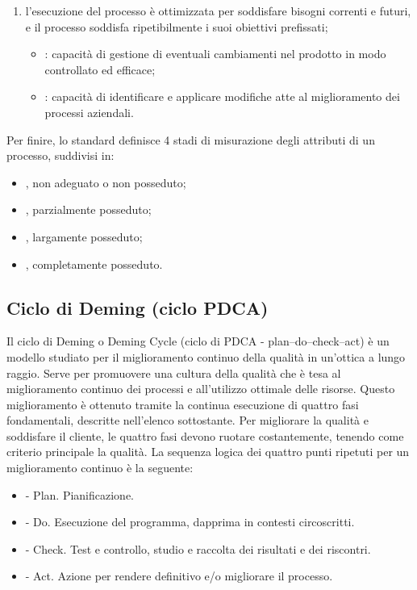 \begin{enumerate}
\begin{itemize}
\end{itemize}
\item  {} l'esecuzione del processo è ottimizzata per soddisfare bisogni correnti e futuri, e il processo soddisfa ripetibilmente i suoi obiettivi prefissati;
\begin{itemize}
\item {}: capacità di gestione di eventuali cambiamenti nel prodotto in modo controllato ed efficace;
\item {}: capacità di identificare e applicare modifiche atte al miglioramento dei processi aziendali.
\end{itemize}
\end{enumerate}
Per finire, lo standard definisce 4 stadi di misurazione degli attributi di un processo, suddivisi in:
\begin{itemize}
\item {}, non adeguato o non posseduto;
\item {}, parzialmente posseduto;
\item {}, largamente posseduto;
\item {}, completamente posseduto.
\end{itemize}

\subsection{Ciclo di Deming (ciclo PDCA)} %

Il ciclo di Deming o Deming Cycle (ciclo di PDCA - plan–do–check–act) è un modello studiato per il miglioramento continuo della qualità in un'ottica a lungo raggio. Serve per promuovere una cultura della qualità che è tesa al miglioramento continuo dei processi e all'utilizzo ottimale delle risorse. Questo miglioramento è ottenuto tramite la continua esecuzione di quattro fasi fondamentali, descritte nell'elenco sottostante. Per migliorare la qualità e soddisfare il cliente, le quattro fasi devono ruotare costantemente, tenendo come criterio principale la qualità.
La sequenza logica dei quattro punti ripetuti per un miglioramento continuo è la seguente:
\begin{itemize}
\item {} - Plan. Pianificazione.
\item {} - Do. Esecuzione del programma, dapprima in contesti circoscritti.
\item {} - Check. Test e controllo, studio e raccolta dei risultati e dei riscontri.
\item {} - Act. Azione per rendere definitivo e/o migliorare il processo.
\end{itemize}

